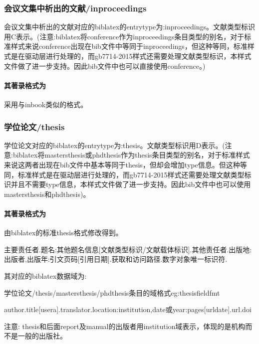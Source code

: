 \subsubsection{会议文集中析出的文献/inproceedings}
\begin{refentry}{}{}
会议文集中析出的文献对应的biblatex的entrytype为:inproceedings。文献类型标识用C表示。(注意:biblatex将conference作为inproceedings条目类型的别名，对于标准样式来说conference出现在bib文件中等同于inproceedings，但这种等同，标准样式是在驱动层进行处理的，而gb7714-2015样式还需要处理文献类型标识，本样式文件做了进一步支持。因此bib文件中也可以直接使用conference。)

\paragraph{其著录格式为} 采用与inbook类似的格式。
\end{refentry}

\subsubsection{学位论文/thesis}
\begin{refentry}{}{}
学位论文对应的biblatex的entrytype为:thesis。文献类型标识用D表示。(注意:biblatex将mastersthesis或phdthesis作为thesis条目类型的别名，对于标准样式来说这两者出现在bib文件中基本等同于thesis，但却会增加type信息。但这种等同，标准样式是在驱动层进行处理的，而gb7714-2015样式还需要处理文献类型标识并且不需要type信息，本样式文件做了进一步支持。因此bib文件中也可以使用mastersthesis和phdthesis)。

\paragraph{其著录格式为} 由biblatex的标准thesis格式修改得到。

主要责任者.题名:其他题名信息[文献类型标识/文献载体标识].其他责任者.出版地:出版者,出版年:引文页码[引用日期].获取和访问路径.数字对象唯一标识符.
\end{refentry}

其对应的biblatex数据域为:
\begin{example}{学位论文/thesis/mastersthesis/phdthesis条目的域格式}{eg:thesisfieldfmt}
\begin{texlist}
author.title[usera].translator.location:institution,date或year:pages[urldate].url.doi
\end{texlist}
\end{example}

注意: thesis和后面report及manual的出版者用institution域表示，体现的是机构而不是一般的出版社。

